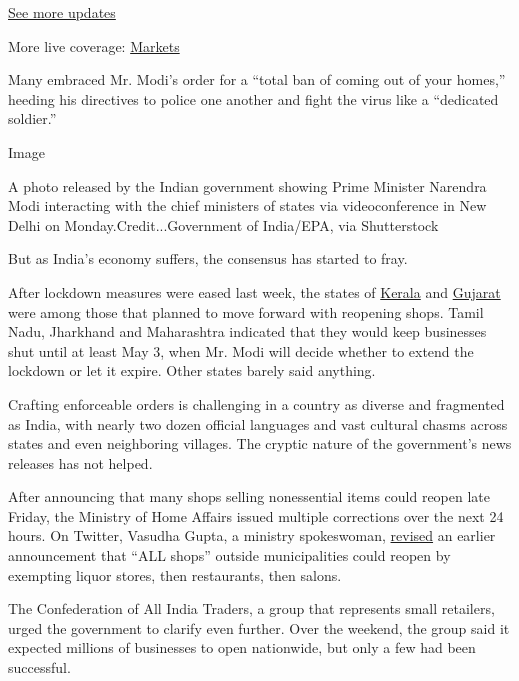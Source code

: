 \href{https://www.nytimes.com/2020/08/01/world/coronavirus-covid-19.html?action=click\&pgtype=Article\&state=default\&region=MAIN_CONTENT_1\&context=storylines_live_updates}{See
more updates}

More live coverage:
\href{https://www.nytimes.com/live/2020/07/31/business/stock-market-today-coronavirus?action=click\&pgtype=Article\&state=default\&region=MAIN_CONTENT_1\&context=storylines_live_updates}{Markets}

Many embraced Mr. Modi's order for a ``total ban of coming out of your
homes,'' heeding his directives to police one another and fight the
virus like a ``dedicated soldier.''

Image

A photo released by the Indian government showing Prime Minister
Narendra Modi interacting with the chief ministers of states via
videoconference in New Delhi on Monday.Credit...Government of India/EPA,
via Shutterstock

But as India's economy suffers, the consensus has started to fray.

After lockdown measures were eased last week, the states of
\href{https://www.newindianexpress.com/states/kerala/2020/apr/25/with-centre-relaxing-lockdown-restrictions-kerala-allows-shops-to-open-in-rural-areas-2135151.html}{Kerala}
and
\href{https://www.outlookindia.com/newsscroll/small-shops-trades-to-be-allowed-from-sunday-in-gujarat-ld/1814354}{Gujarat}
were among those that planned to move forward with reopening shops.
Tamil Nadu, Jharkhand and Maharashtra indicated that they would keep
businesses shut until at least May 3, when Mr. Modi will decide whether
to extend the lockdown or let it expire. Other states barely said
anything.

Crafting enforceable orders is challenging in a country as diverse and
fragmented as India, with nearly two dozen official languages and vast
cultural chasms across states and even neighboring villages. The cryptic
nature of the government's news releases has not helped.

After announcing that many shops selling nonessential items could reopen
late Friday, the Ministry of Home Affairs issued multiple corrections
over the next 24 hours. On Twitter, Vasudha Gupta, a ministry
spokeswoman,
\href{https://twitter.com/PIBHomeAffairs/status/1253969490142003200}{revised}
an earlier announcement that ``ALL shops'' outside municipalities could
reopen by exempting liquor stores, then restaurants, then salons.

The Confederation of All India Traders, a group that represents small
retailers, urged the government to clarify even further. Over the
weekend, the group said it expected millions of businesses to open
nationwide, but only a few had been successful.

